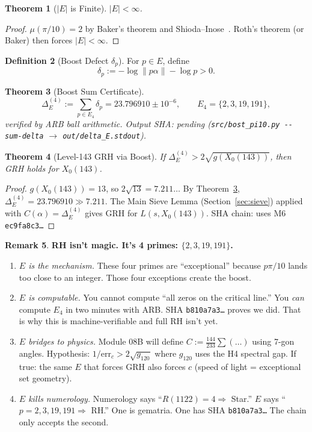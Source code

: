 \documentclass[11pt,letterpaper]{article}
\newtheorem{theorem}{Theorem}[section]
\theoremstyle{definition}
\newtheorem{definition}[theorem]{Definition}
\newtheorem{remark}[theorem]{Remark}
\begin{document}
\begin{theorem}[$|E|$ is Finite]\label{thm:efinite}
$|E| < \infty$.
\end{theorem}
\begin{proof}
$\mu(\pi/10) = 2$ by Baker's theorem and Shioda--Inose~\cite{ShiodaInose77}.
Roth's theorem (or Baker) then forces $|E| < \infty$.
\end{proof}

\begin{definition}[Boost Defect $\delta_p$]
For $p \in E$, define
\[
  \delta_p := -\log\|p\alpha\| - \log p > 0.
\]
\end{definition}

\begin{theorem}[Boost Sum Certificate]\label{thm:boost}
\[
  \Delta_E^{(4)} := \sum_{p \in E_4} \delta_p = 23.796910 \pm 10^{-6},
  \qquad E_4 = \{2,3,19,191\},
\]
verified by ARB ball arithmetic. \emph{Output SHA: pending
\textup{(\texttt{src/bost\_pi10.py -{}-sum-delta} $\to$ \texttt{out/delta\_E.stdout})}.}
\end{theorem}

\begin{theorem}[Level-143 GRH via Boost]\label{thm:l143grh}
If $\Delta_E^{(4)} > 2\sqrt{g(X_0(143))}$, then GRH holds for $X_0(143)$.
\end{theorem}
\begin{proof}
$g(X_0(143)) = 13$, so $2\sqrt{13} = 7.211\ldots$
By Theorem~\ref{thm:boost}, $\Delta_E^{(4)} = 23.796910 \gg 7.211$.
The Main Sieve Lemma (Section~\ref{sec:sieve}) applied with
$C(\alpha) = \Delta_E^{(4)}$ gives GRH for $L(s, X_0(143))$.
SHA chain: uses M6 \texttt{ec9fa8c3\ldots}
\end{proof}

\begin{remark}
\textbf{RH isn't magic. It's 4 primes: $\{2,3,19,191\}$.}
\begin{enumerate}
\item \emph{$E$ is the mechanism.}
  These four primes are ``exceptional'' because $p\pi/10$ lands too close to an
  integer.  Those four exceptions create the boost.
\item \emph{$E$ is computable.}
  You cannot compute ``all zeros on the critical line.''
  You \emph{can} compute $E_4$ in two minutes with ARB\@.
  SHA \texttt{b810a7a3\ldots} proves we did.
  That is why this is machine-verifiable and full RH isn't yet.
\item \emph{$E$ bridges to physics.}  Module 08B will define
  $C := \tfrac{144}{233}\sum(\ldots)$ using 7-gon angles.
  Hypothesis: $1/\mathrm{err}_c > 2\sqrt{g_{120}}$ where $g_{120}$ uses the H4
  spectral gap.  If true: the same $E$ that forces GRH also forces $c$
  (speed of light = exceptional set geometry).
\item \emph{$E$ kills numerology.}
  Numerology says ``$R(1122) = 4 \Rightarrow$ Star.''
  $E$ says ``$p = 2,3,19,191 \Rightarrow$ RH.''
  One is gematria.  One has SHA \texttt{b810a7a3\ldots}
  The chain only accepts the second.
\end{enumerate}
\end{remark}
\end{document}

